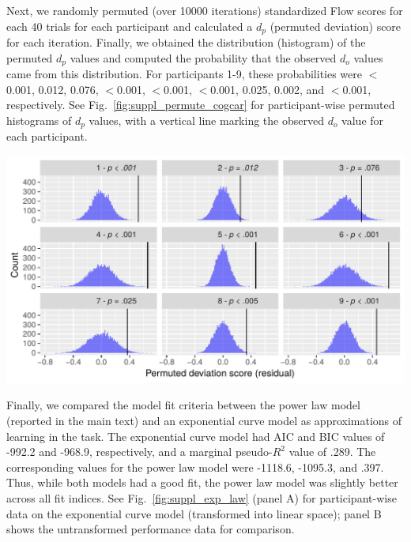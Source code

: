 \documentclass{article}
\begin{document}
Next, we randomly permuted (over 10000 iterations) standardized Flow scores for each 40 trials for each participant and calculated a $d_p$ (permuted deviation) score for each iteration. Finally, we obtained the distribution (histogram) of the permuted $d_p$ values and computed the probability that the observed $d_o$ values came from this distribution. For participants 1-9, these probabilities were $<$0.001, 0.012, 0.076, $<$0.001, $<$0.001, $<$0.001, 0.025, 0.002, and $<$0.001, respectively. See Fig.~\ref{fig:suppl_permute_cogcar} for participant-wise permuted histograms of $d_p$ values, with a vertical line marking the observed $d_o$ value for each participant.

\begin{minipage}{\textwidth}
\centering
\includegraphics[width=\linewidth]{suppl_permute_cogcar}
\label{fig:suppl_permute_cogcar}
\end{minipage}

Finally, we compared the model fit criteria between the power law model (reported in the main text) and an exponential curve model as approximations of learning in the task. The exponential curve model had AIC and BIC values of -992.2 and -968.9, respectively, and a marginal pseudo-$R^2$ value of .289. The corresponding values for the power law model were -1118.6, -1095.3, and .397. Thus, while both models had a good fit, the power law model was slightly better across all fit indices. See Fig.~\ref{fig:suppl_exp_law} (panel A) for participant-wise data on the exponential curve model (transformed into linear space); panel B shows the untransformed performance data for comparison.
\end{document}
